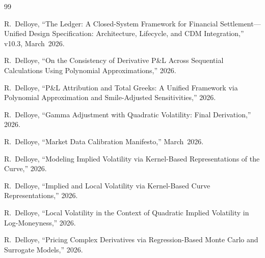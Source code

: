 \documentclass[11pt,a4paper]{article}
\begin{document}
\clearpage
\begin{thebibliography}{99}

R.~Delloye, ``The Ledger: A Closed-System Framework for Financial Settlement---Unified Design Specification: Architecture, Lifecycle, and CDM Integration,'' v10.3, March~2026.

R.~Delloye, ``On the Consistency of Derivative P\&L Across Sequential Calculations Using Polynomial Approximations,'' 2026.

R.~Delloye, ``P\&L Attribution and Total Greeks: A Unified Framework via Polynomial Approximation and Smile-Adjusted Sensitivities,'' 2026.

R.~Delloye, ``Gamma Adjustment with Quadratic Volatility: Final Derivation,'' 2026.

R.~Delloye, ``Market Data Calibration Manifesto,'' March~2026.

R.~Delloye, ``Modeling Implied Volatility via Kernel-Based Representations of the Curve,'' 2026.

R.~Delloye, ``Implied and Local Volatility via Kernel-Based Curve Representations,'' 2026.

R.~Delloye, ``Local Volatility in the Context of Quadratic Implied Volatility in Log-Moneyness,'' 2026.

R.~Delloye, ``Pricing Complex Derivatives via Regression-Based Monte Carlo and Surrogate Models,'' 2026.

\end{thebibliography}
\end{document}
